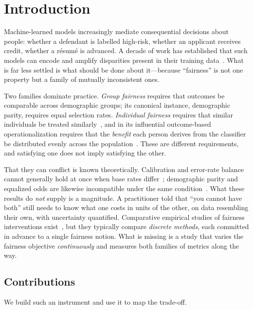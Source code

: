 \section{Introduction}
\label{sec:intro}

Machine-learned models increasingly mediate consequential decisions about
people: whether a defendant is labelled high-risk, whether an applicant
receives credit, whether a r\'esum\'e is advanced. A decade of work has
established that such models can encode and amplify disparities present in
their training data~\cite{angwin2016machine,buolamwini2018gender,mehrabi2021survey}.
What is far less settled is what should be done about it---because
``fairness'' is not one property but a family of mutually inconsistent ones.

Two families dominate practice. \emph{Group fairness} requires that outcomes
be comparable across demographic groups; its canonical instance, demographic
parity, requires equal selection rates. \emph{Individual fairness} requires
that similar individuals be treated similarly~\cite{dwork2012fairness}, and in
its influential outcome-based operationalization requires that the
\emph{benefit} each person derives from the classifier be distributed evenly
across the population~\cite{speicher2018unified}. These are different
requirements, and satisfying one does not imply satisfying the other.

That they can conflict is known theoretically. Calibration and error-rate
balance cannot generally hold at once when base rates
differ~\cite{kleinberg2016inherent,chouldechova2017fair}; demographic parity
and equalized odds are likewise incompatible under the same
condition~\cite{barocas2019fairness}. What these results do \emph{not} supply
is a magnitude. A practitioner told that ``you cannot have both'' still needs
to know what one costs in units of the other, on data resembling their own,
with uncertainty quantified. Comparative empirical studies of fairness
interventions exist~\cite{friedler2019comparative}, but they typically compare
\emph{discrete methods}, each committed in advance to a single fairness
notion. What is missing is a study that varies the fairness objective
\emph{continuously} and measures both families of metrics along the way.

\subsection{Contributions}

We build such an instrument and use it to map the trade-off.

